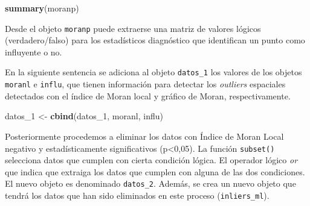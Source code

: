 \documentclass[11pt,b5paper,]{krantz}
\newenvironment{Shaded}{}{}
\newcommand{\KeywordTok}[1]{\textcolor[rgb]{0.00,0.44,0.13}{\textbf{#1}}}
\newcommand{\DecValTok}[1]{\textcolor[rgb]{0.25,0.63,0.44}{#1}}
\newcommand{\StringTok}[1]{\textcolor[rgb]{0.25,0.44,0.63}{#1}}
\newcommand{\CommentTok}[1]{\textcolor[rgb]{0.38,0.63,0.69}{\textit{#1}}}
\newcommand{\OperatorTok}[1]{\textcolor[rgb]{0.40,0.40,0.40}{#1}}
\newcommand{\NormalTok}[1]{#1}
\begin{document}
\begin{Shaded}
\begin{Highlighting}[]
\KeywordTok{summary}\NormalTok{(moranp)}
\end{Highlighting}
\end{Shaded}

Desde el objeto \texttt{moranp} puede extraerse una matriz de valores
lógicos (verdadero/falso) para los estadísticos diagnóstico que
identifican un punto como influyente o no.

\begin{Shaded}
\end{Shaded}

En la siguiente sentencia se adiciona al objeto \texttt{datos\_1} los
valores de los objetos \texttt{moranl} e \texttt{influ}, que tienen
información para detectar los \emph{outliers} espaciales detectados con
el índice de Moran local y gráfico de Moran, respectivamente.

\begin{Shaded}
\begin{Highlighting}[]
\NormalTok{datos_}\DecValTok{1}\NormalTok{ <-}\StringTok{ }\KeywordTok{cbind}\NormalTok{(datos_}\DecValTok{1}\NormalTok{, moranl, influ)}
\end{Highlighting}
\end{Shaded}

Posteriormente procedemos a eliminar los datos con Índice de Moran Local
negativo y estadísticamente significativos (p\textless{}0,05). La
función \texttt{subset()} selecciona datos que cumplen con cierta
condición lógica. El operador lógico \emph{or} que indica que extraiga
los datos que cumplen con alguna de las dos condiciones. El nuevo objeto
es denominado \texttt{datos\_2}. Además, se crea un nuevo objeto que
tendrá los datos que han sido eliminados en este proceso
(\texttt{inliers\_ml}).
\end{document}
